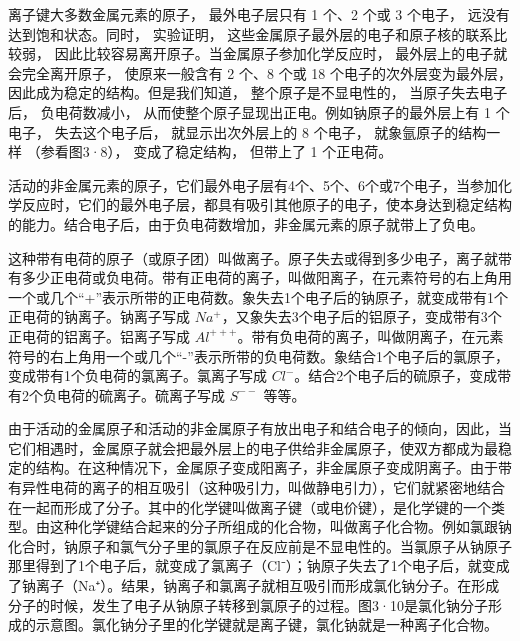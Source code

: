 离子键大多数金属元素的原子， 最外电子层只有 1 个、2 个或 3 个电子，
远没有达到饱和状态。同时， 实验证明，
这些金属原子最外层的电子和原子核的联系比较弱，
因此比较容易离开原子。当金属原子参加化学反应时，
最外层上的电子就会完全离开原子， 使原来一般含有 2 个、8 个或 18
个电子的次外层变为最外层， 因此成为稳定的结构。但是我们知道，
整个原子是不显电性的， 当原子失去电子后， 负电荷数减小，
从而使整个原子显现出正电。例如钠原子的最外层上有 1 个电子，
失去这个电子后， 就显示出次外层上的 8 个电子， 就象氩原子的结构一样
（参看图3·8）， 变成了稳定结构， 但带上了 1 个正电荷。

活动的非金属元素的原子，它们最外电子层有4个、5个、6个或7个电子，当参加化学反应时，它们的最外电子层，都具有吸引其他原子的电子，使本身达到稳定结构的能力。结合电子后，由于负电荷数增加，非金属元素的原子就带上了负电。

这种带有电荷的原子（或原子团）叫做离子。原子失去或得到多少电子，离子就带有多少正电荷或负电荷。带有正电荷的离子，叫做阳离子，在元素符号的右上角用一个或几个``+''表示所带的正电荷数。象失去1个电子后的钠原子，就变成带有1个正电荷的钠离子。钠离子写成
\(Na^{+}\)，又象失去3个电子后的铝原子，变成带有3个正电荷的铝离子。铝离子写成
\(Al^{+++}\)。带有负电荷的离子，叫做阴离子，在元素符号的右上角用一个或几个``-''表示所带的负电荷数。象结合1个电子后的氯原子，变成带有1个负电荷的氯离子。氯离子写成
\(Cl^{-}\)。结合2个电子后的硫原子，变成带有2个负电荷的硫离子。硫离子写成
\(S^{--}\) 等等。

由于活动的金属原子和活动的非金属原子有放出电子和结合电子的倾向，因此，当它们相遇时，金属原子就会把最外层上的电子供给非金属原子，使双方都成为最稳定的结构。在这种情况下，金属原子变成阳离子，非金属原子变成阴离子。由于带有异性电荷的离子的相互吸引（这种吸引力，叫做静电引力），它们就紧密地结合在一起而形成了分子。其中的化学键叫做离子键（或电价键），是化学键的一个类型。由这种化学键结合起来的分子所组成的化合物，叫做离子化合物。例如氯跟钠化合时，钠原子和氯气分子里的氯原子在反应前是不显电性的。当氯原子从钠原子那里得到了1个电子后，就变成了氯离子（Cl⁻）；钠原子失去了1个电子后，就变成了钠离子（Na⁺）。结果，钠离子和氯离子就相互吸引而形成氯化钠分子。在形成分子的时候，发生了电子从钠原子转移到氯原子的过程。图3·10是氯化钠分子形成的示意图。氯化钠分子里的化学键就是离子键，氯化钠就是一种离子化合物。

